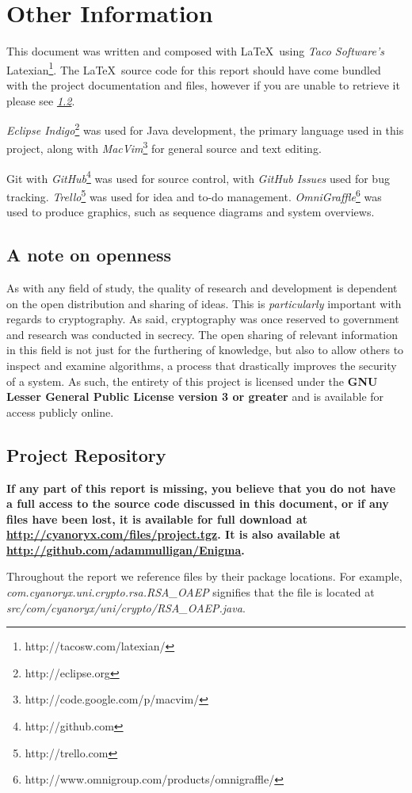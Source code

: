 \section{Other Information}

This document was written and composed with \LaTeX \ using \emph{Taco Software's} Latexian\footnote{http://tacosw.com/latexian/}. The \LaTeX \ source code for this report should have come bundled with the project documentation and files, however if you are unable to retrieve it please see \emph{\textsection \ref{sec:project_repo}}.

\emph{Eclipse Indigo}\footnote{http://eclipse.org} was used for Java development, the primary language used in this project, along with \emph{MacVim}\footnote{http://code.google.com/p/macvim/} for general source and text editing.

Git with \emph{GitHub}\footnote{http://github.com} was used for source control, with \emph{GitHub Issues} used for bug tracking. \emph{Trello}\footnote{http://trello.com} was used for idea and to-do management. \emph{OmniGraffle}\footnote{http://www.omnigroup.com/products/omnigraffle/} was used to produce graphics, such as sequence diagrams and system overviews.

\subsection{A note on openness}

As with any field of study, the quality of research and development is dependent on the open distribution and sharing of ideas. This is \emph{particularly} important with regards to cryptography. As said, cryptography was once reserved to government and research was conducted in secrecy. The open sharing of relevant information in this field is not just for the furthering of knowledge, but also to allow others to inspect and examine algorithms, a process that drastically improves the security of a system. As such, the entirety of this project is licensed under the \textbf{GNU Lesser General Public License version 3 or greater} and is available for access publicly online.

\subsection{Project Repository}
\label{sec:project_repo}

\textbf{If any part of this report is missing, you believe that you do not have a full access to the source code discussed in this document, or if any files have been lost, it is available for full download at \url{http://cyanoryx.com/files/project.tgz}. It is also available at \url{http://github.com/adammulligan/Enigma}.}

Throughout the report we reference files by their package locations. For example, \emph{com.cyanoryx.uni.crypto.rsa.RSA\_OAEP} signifies that the file is located at \emph{src/com/cyanoryx/uni/crypto/RSA\_OAEP.java}.